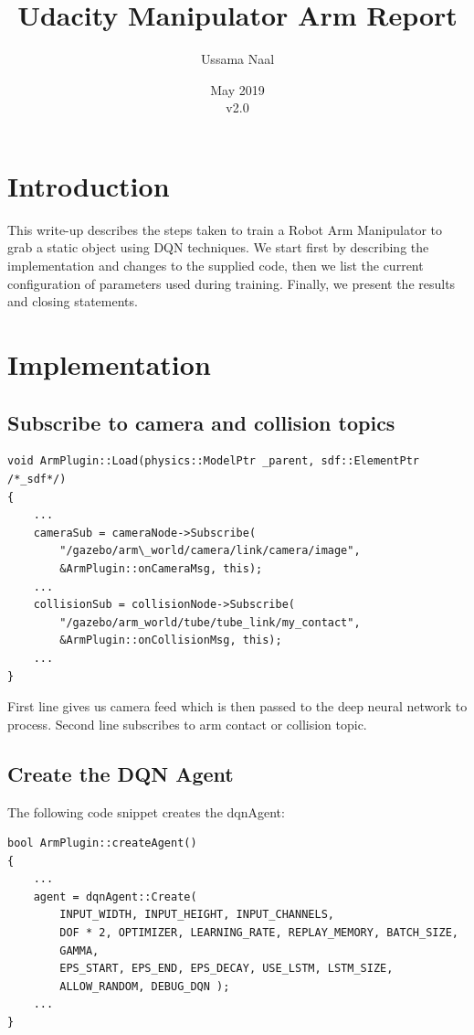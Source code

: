 \documentclass{article}
\title{Udacity Manipulator Arm Report}
\author{Ussama Naal}
\date{May 2019\\v2.0}
\begin{document}
\maketitle

\section{Introduction}

This write-up describes the steps taken to train a Robot Arm Manipulator to grab a static object using DQN techniques. We start first by describing the implementation and changes to the supplied code, then we list the current configuration of  parameters used during training. Finally, we present the results and closing statements.

\section{Implementation}

\subsection{Subscribe to camera and collision topics}

\begin{lstlisting}
void ArmPlugin::Load(physics::ModelPtr _parent, sdf::ElementPtr /*_sdf*/)
{
    ...
    cameraSub = cameraNode->Subscribe(
        "/gazebo/arm\_world/camera/link/camera/image",
        &ArmPlugin::onCameraMsg, this);
    ...
    collisionSub = collisionNode->Subscribe(
        "/gazebo/arm_world/tube/tube_link/my_contact",
        &ArmPlugin::onCollisionMsg, this);
    ...
}
\end{lstlisting}

First line gives us camera feed which is then passed to the deep neural network to process. Second line subscribes to arm contact or collision topic.



\subsection{Create the DQN Agent}

The following code snippet creates the dqnAgent:

\begin{lstlisting}
bool ArmPlugin::createAgent()
{
    ...
    agent = dqnAgent::Create(
        INPUT_WIDTH, INPUT_HEIGHT, INPUT_CHANNELS,
    	DOF * 2, OPTIMIZER, LEARNING_RATE, REPLAY_MEMORY, BATCH_SIZE,
    	GAMMA,
    	EPS_START, EPS_END, EPS_DECAY, USE_LSTM, LSTM_SIZE,
    	ALLOW_RANDOM, DEBUG_DQN );
    ...
}
\end{lstlisting}
\end{document}
